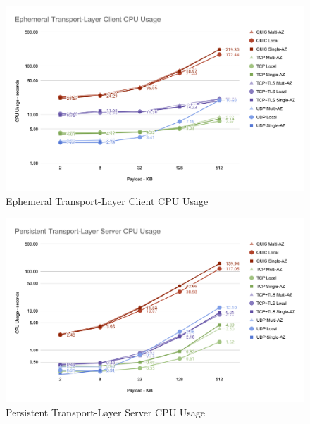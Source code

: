 \begin{figure}[h!]
    \centering
    \includegraphics[width=\linewidth]{figures/charts/Ephemeral Transport-Layer Client CPU Usage.png}
    \caption{Ephemeral Transport-Layer Client CPU Usage}
    \label{fig:ephemeral_client_transport_cpu}
\end{figure}


\begin{figure}[h!]
    \centering
    \includegraphics[width=\linewidth]{figures/charts/Persistent Transport-Layer Server CPU Usage.png}
    \caption{Persistent Transport-Layer Server CPU Usage}
    \label{fig:persistent_server_transport_cpu}
\end{figure}

